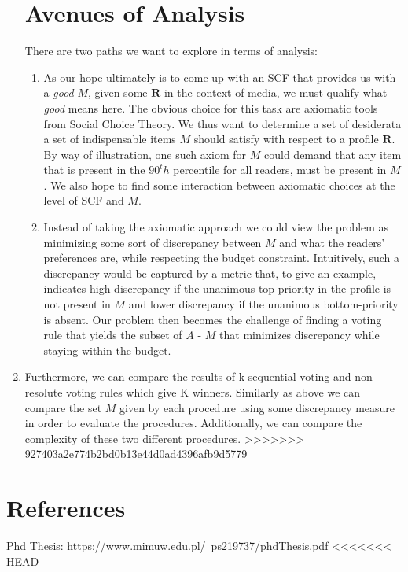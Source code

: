 \documentclass[10pt,a4paper]{article}
\begin{document}
\begin{enumerate}
\section{Avenues of Analysis} 
There are two paths we want to explore in terms of analysis:
\begin{enumerate}
\item As our hope ultimately is to come up with an SCF that provides us with a \textit{good} $M$, given some $\mathbf{R}$ in the context of media, we must qualify what \textit{good} means here. The obvious choice for this task are axiomatic tools from Social Choice Theory. We thus want to determine a set of desiderata a set of indispensable items $M$ should satisfy with respect to a profile $\mathbf{R}$. By way of illustration, one such axiom for $M$ could demand that any item that is present in the $90^th$ percentile for all readers, must be present in $M$.
We also hope to find some interaction between axiomatic choices at the level of SCF and $M$.
\item Instead of taking the axiomatic approach we could view the problem as minimizing some sort of discrepancy between $M$ and what the readers' preferences are, while respecting the budget constraint. Intuitively, such a discrepancy would be captured by a metric that, to give an example, indicates high discrepancy if the unanimous top-priority in the profile is not present in $M$ and lower discrepancy if the unanimous bottom-priority is absent. Our problem then becomes the challenge of finding a voting rule that yields the subset of $A$ - $M$ that minimizes discrepancy while staying within the budget.
\end{enumerate}
\item Furthermore, we can compare the results of k-sequential voting and non-resolute voting rules which give K winners. Similarly as above we can compare the set $M$ given by each procedure using some discrepancy measure in order to evaluate the procedures. Additionally, we can compare the complexity of these two different procedures.
>>>>>>> 927403a2e774b2bd0b13e44d0ad4396afb9d5779
\end{enumerate}

\section{References}
Phd Thesis: https://www.mimuw.edu.pl/~ps219737/phdThesis.pdf
<<<<<<< HEAD
\end{document}
